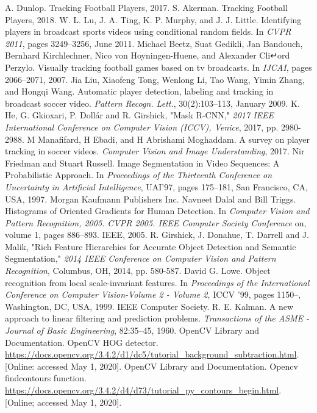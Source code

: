 \documentclass{article}
\begin{document}
\begin{thebibliography}{2}
 A. Dunlop. Tracking Football Players, 2017.
 S. Akerman. Tracking Football Players, 2018.
 W. L. Lu, J. A. Ting, K. P. Murphy, and J. J. Little. Identifying players in broadcast sports videos using conditional random fields. In \textit{CVPR 2011}, pages 3249–3256, June 2011.
 Michael Beetz, Suat Gedikli, Jan Bandouch, Bernhard Kirchlechner, Nico von
Hoyningen-Huene, and Alexander Cli↵ord Perzylo. Visually tracking football games
based on tv broadcasts. In \textit{IJCAI}, pages 2066–2071, 2007.
 Jia Liu, Xiaofeng Tong, Wenlong Li, Tao Wang, Yimin Zhang, and Hongqi Wang.
Automatic player detection, labeling and tracking in broadcast soccer video. \textit{Pattern Recogn. Lett.}, 30(2):103–113, January 2009.
 K. He, G. Gkioxari, P. Dollár and R. Girshick, "Mask R-CNN," \textit{2017 IEEE International Conference on Computer Vision (ICCV), Venice}, 2017, pp. 2980-2988.
 M Manafifard, H Ebadi, and H Abrishami Moghaddam. A survey on player tracking in soccer videos. \textit{Computer Vision and Image Understanding}, 2017.
 Nir Friedman and Stuart Russell. Image Segmentation in Video Sequences: A Probabilistic Approach. In \textit{Proceedings of the Thirteenth Conference on Uncertainty in Artificial Intelligence}, UAI’97, pages 175–181, San Francisco, CA, USA, 1997. Morgan Kaufmann Publishers Inc.
 Navneet Dalal and Bill Triggs. Histograms of Oriented Gradients for Human Detection. In \textit{Computer Vision and Pattern Recognition, 2005. CVPR 2005. IEEE Computer Society Conference} on, volume 1, pages 886–893. IEEE, 2005.
 R. Girshick, J. Donahue, T. Darrell and J. Malik, "Rich Feature Hierarchies for Accurate Object Detection and Semantic Segmentation," \textit{2014 IEEE Conference on Computer Vision and Pattern Recognition}, Columbus, OH, 2014, pp. 580-587.
 David G. Lowe. Object recognition from local scale-invariant features. In \textit{Proceedings of the International Conference on Computer Vision-Volume 2 - Volume 2,} ICCV ’99, pages 1150–, Washington, DC, USA, 1999. IEEE Computer Society.
 R. E. Kalman. A new approach to linear filtering and prediction problems.
\textit{Transactions of the ASME - Journal of Basic Engineering}, 82:35–45, 1960.
 OpenCV Library and Documentation. OpenCV HOG detector. \url{https://docs.opencv.org/3.4.2/d1/dc5/tutorial_background_subtraction.html}. [Online: accessed May 1, 2020].
 OpenCV Library and Documentation. Opencv findcontours function. \url{https://docs.opencv.org/3.4.2/d4/d73/tutorial_py_contours_begin.html}. [Online; accessed May 1, 2020].

\end{thebibliography}
\end{document}
